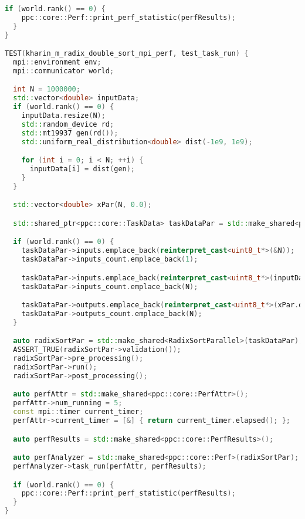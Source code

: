 \documentclass[a4paper,12pt]{article}
\begin{document}
\begin{lstlisting}[language=C++, caption={Тесты}]
  if (world.rank() == 0) {
    ppc::core::Perf::print_perf_statistic(perfResults);
  }
}

TEST(kharin_m_radix_double_sort_mpi_perf, test_task_run) {
  mpi::environment env;
  mpi::communicator world;

  int N = 1000000;
  std::vector<double> inputData;
  if (world.rank() == 0) {
    inputData.resize(N);
    std::random_device rd;
    std::mt19937 gen(rd());
    std::uniform_real_distribution<double> dist(-1e9, 1e9);

    for (int i = 0; i < N; ++i) {
      inputData[i] = dist(gen);
    }
  }

  std::vector<double> xPar(N, 0.0);

  std::shared_ptr<ppc::core::TaskData> taskDataPar = std::make_shared<ppc::core::TaskData>();

  if (world.rank() == 0) {
    taskDataPar->inputs.emplace_back(reinterpret_cast<uint8_t*>(&N));
    taskDataPar->inputs_count.emplace_back(1);

    taskDataPar->inputs.emplace_back(reinterpret_cast<uint8_t*>(inputData.data()));
    taskDataPar->inputs_count.emplace_back(N);

    taskDataPar->outputs.emplace_back(reinterpret_cast<uint8_t*>(xPar.data()));
    taskDataPar->outputs_count.emplace_back(N);
  }

  auto radixSortPar = std::make_shared<RadixSortParallel>(taskDataPar);
  ASSERT_TRUE(radixSortPar->validation());
  radixSortPar->pre_processing();
  radixSortPar->run();
  radixSortPar->post_processing();

  auto perfAttr = std::make_shared<ppc::core::PerfAttr>();
  perfAttr->num_running = 5;  
  const mpi::timer current_timer;
  perfAttr->current_timer = [&] { return current_timer.elapsed(); };

  auto perfResults = std::make_shared<ppc::core::PerfResults>();

  auto perfAnalyzer = std::make_shared<ppc::core::Perf>(radixSortPar);
  perfAnalyzer->task_run(perfAttr, perfResults);

  if (world.rank() == 0) {
    ppc::core::Perf::print_perf_statistic(perfResults);
  }
}
\end{lstlisting}
\end{document}
